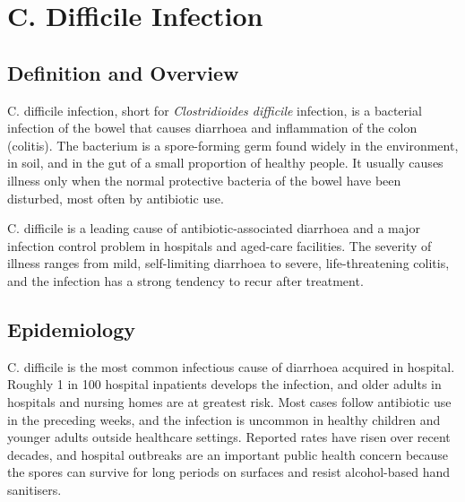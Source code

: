 \chapter{C. Difficile Infection}

\section*{Definition and Overview}
C. difficile infection, short for \textit{Clostridioides difficile} infection, is a bacterial infection of the bowel that causes diarrhoea and inflammation of the colon (colitis). The bacterium is a spore-forming germ found widely in the environment, in soil, and in the gut of a small proportion of healthy people. It usually causes illness only when the normal protective bacteria of the bowel have been disturbed, most often by antibiotic use.

C. difficile is a leading cause of antibiotic-associated diarrhoea and a major infection control problem in hospitals and aged-care facilities. The severity of illness ranges from mild, self-limiting diarrhoea to severe, life-threatening colitis, and the infection has a strong tendency to recur after treatment.

\section*{Epidemiology}
C. difficile is the most common infectious cause of diarrhoea acquired in hospital. Roughly 1 in 100 hospital inpatients develops the infection, and older adults in hospitals and nursing homes are at greatest risk. Most cases follow antibiotic use in the preceding weeks, and the infection is uncommon in healthy children and younger adults outside healthcare settings. Reported rates have risen over recent decades, and hospital outbreaks are an important public health concern because the spores can survive for long periods on surfaces and resist alcohol-based hand sanitisers.

